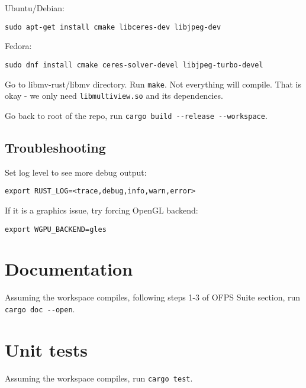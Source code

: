 Ubuntu/Debian:

\begin{lstlisting}
sudo apt-get install cmake libceres-dev libjpeg-dev
\end{lstlisting}

Fedora:

\begin{lstlisting}
sudo dnf install cmake ceres-solver-devel libjpeg-turbo-devel
\end{lstlisting}

Go to libmv-rust/libmv directory. Run \texttt{make}. Not everything will
compile. That is okay - we only need \texttt{libmultiview.so} and its
dependencies.

Go back to root of the repo, run
\texttt{cargo\ build\ -\/-release\ -\/-workspace}.

\subsection*{Troubleshooting}

Set log level to see more debug output:

\begin{lstlisting}
export RUST_LOG=<trace,debug,info,warn,error>
\end{lstlisting}

If it is a graphics issue, try forcing OpenGL backend:

\begin{lstlisting}
export WGPU_BACKEND=gles
\end{lstlisting}

\section*{Documentation}

Assuming the workspace compiles, following steps 1-3 of OFPS Suite
section, run \texttt{cargo\ doc\ -\/-open}.

\section*{Unit tests}

Assuming the workspace compiles, run \texttt{cargo\ test}.

